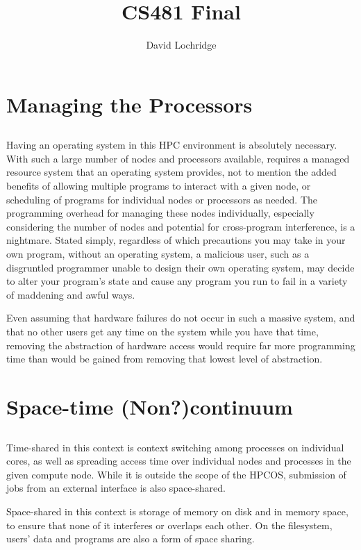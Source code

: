 \documentclass{article}
\title{CS481 Final}
\author{David Lochridge}
\begin{document}
\section{}
\section*{Managing the Processors}
\subsection{}
Having an operating system in this HPC environment is absolutely necessary. With such a large number of nodes and processors available, requires a managed resource system that an operating system provides, not to mention the added benefits of allowing multiple programs to interact with a given node, or scheduling of programs for individual nodes or processors as needed. The programming overhead for managing these nodes individually, especially considering the number of nodes and potential for cross-program interference, is a nightmare. Stated simply, regardless of which precautions you may take in your own program, without an operating system, a malicious user, such as a disgruntled programmer unable to design their own operating system, may decide to alter your program's state and cause any program you run to fail in a variety of maddening and awful ways.

Even assuming that hardware failures do not occur in such a massive system, and that no other users get any time on the system while you have that time, removing the abstraction of hardware access would require far more programming time than would be gained from removing that lowest level of abstraction.

\section*{Space-time (Non?)continuum}
\subsection{}
Time-shared in this context is context switching among processes on individual cores, as well as spreading access time over individual nodes and processes in the given compute node. While it is outside the scope of the HPCOS, submission of jobs from an external interface is also space-shared.

Space-shared in this context is storage of memory on disk and in memory space, to ensure that none of it interferes or overlaps each other. On the filesystem, users' data and programs are also a form of space sharing.
\end{document}
